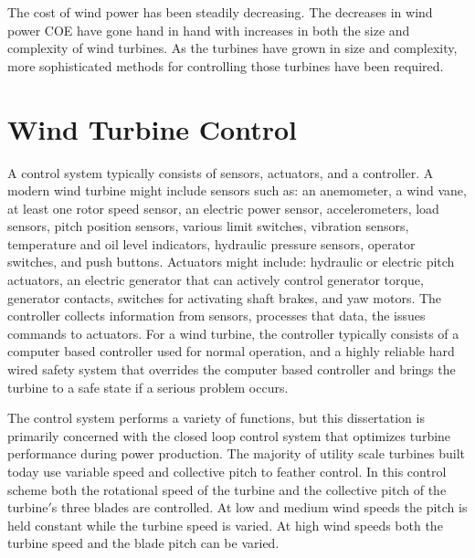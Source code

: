 The cost of wind power has been steadily decreasing.  The decreases in wind power COE have gone hand in hand with increases in both the size and complexity of wind turbines.  As the turbines have grown in size and complexity, more sophisticated methods for controlling those turbines have been required.  



\section{Wind Turbine Control} \label{section1-2} 

A control system typically consists of sensors, actuators, and a controller. A modern wind turbine might include sensors such as: an anemometer, a wind vane, at least one rotor speed sensor, an electric power sensor, accelerometers, load sensors, pitch position sensors, various limit switches, vibration sensors, temperature and oil level indicators, hydraulic pressure sensors, operator switches, and push buttons.  Actuators might include:  hydraulic or electric pitch actuators, an electric generator that can actively control generator torque, generator contacts, switches for activating shaft brakes, and yaw motors.  The controller collects information from sensors, processes that data, the issues commands to actuators. For a wind turbine, the controller typically consists of a computer based controller used for normal operation, and a highly reliable hard wired safety system that overrides the computer based controller and brings the turbine to a safe state if a serious problem occurs.\cite{burton2011}

The control system performs a variety of functions, but this dissertation is primarily concerned with the closed loop control system that optimizes turbine performance during power production. The majority of utility scale turbines built today use variable speed and collective pitch to feather control.  In this control scheme both the rotational speed of the turbine and the collective pitch of the turbine$'$s three blades are controlled. At low and medium wind speeds the pitch is held constant while the turbine speed is varied.  At high wind speeds both the turbine speed and the blade pitch can be varied.

